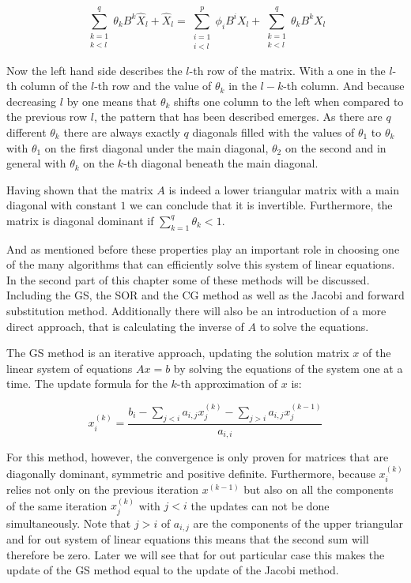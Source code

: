 \begin{equation}\label{eq:ARMA_hat_p_q_transformed_l}
    \displaystyle\sum_{\substack{k=1 \\ k < l}}^{q} \theta_k B^k \hat{X}_{l} + \hat{X}_{l} = \displaystyle\sum_{\substack{i=1 \\ i < l}}^{p} \phi_i B^i X_{l} +\displaystyle\sum_{\substack{k=1 \\ k < l}}^{q} \theta_k B^k X_{l}
\end{equation}

Now the left hand side describes the $l$-th row of the matrix. With a one in the $l$-th column of the $l$-th row and the value of $\theta_k$ in the $l-k$-th column. And because decreasing $l$ by one means that $\theta_k$ shifts one column to the left when compared to the previous row $l$, the pattern that has been described emerges. As there are $q$ different $\theta_k$ there are always exactly $q$ diagonals filled with the values of $\theta_1$ to $\theta_k$ with $\theta_1$ on the first diagonal under the main diagonal, $\theta_2$ on the second and in general with $\theta_k$ on the $k$-th diagonal beneath the main diagonal.

Having shown that the matrix $A$ is indeed a lower triangular matrix with a main diagonal with constant $1$ we can conclude that it is invertible. Furthermore, the matrix is diagonal dominant if $\sum_{k=1}^{q}\theta_k < 1$.

And as mentioned before these properties play an important role in choosing one of the many algorithms that can efficiently solve this system of linear equations. In the second part of this chapter some of these methods will be discussed. Including the \acl{GS}, the \acl{SOR} and the \acl{CG} method as well as the Jacobi and forward substitution method. Additionally there will also be an introduction of a more direct approach, that is calculating the inverse of $A$ to solve the equations.

The \acl{GS} method is an iterative approach, updating the solution matrix $x$ of the linear system of equations $Ax=b$ by solving the equations of the system one at a time. The update formula for the $k$-th approximation of $x$ is:

\begin{equation}\label{eq:Gauss-Seidel_update}
   x_i^{(k)} = \frac{b_i - \sum_{j<i}a_{i,j}x_j^{(k)}-\sum_{j>i}a_{i,j}x_j^{(k-1)}}{a_{i,i}}
\end{equation}

For this method, however, the convergence is only proven for matrices that are diagonally dominant, symmetric and positive definite.
Furthermore, because $x_i^{(k)}$ relies not only on the previous iteration $x^{(k-1)}$ but also on all the components of the same iteration $x_j^{(k)}$ with $j<i$ the updates can not be done simultaneously.\textsuperscript{\cite{BlackGauss-SeidelMethod}}
Note that $j>i$ of $a_{i,j}$ are the components of the upper triangular and for out system of linear equations this means that the second sum will therefore be zero. Later we will see that for out particular case this makes the update of the \acl{GS} method equal to the update of the Jacobi method.


